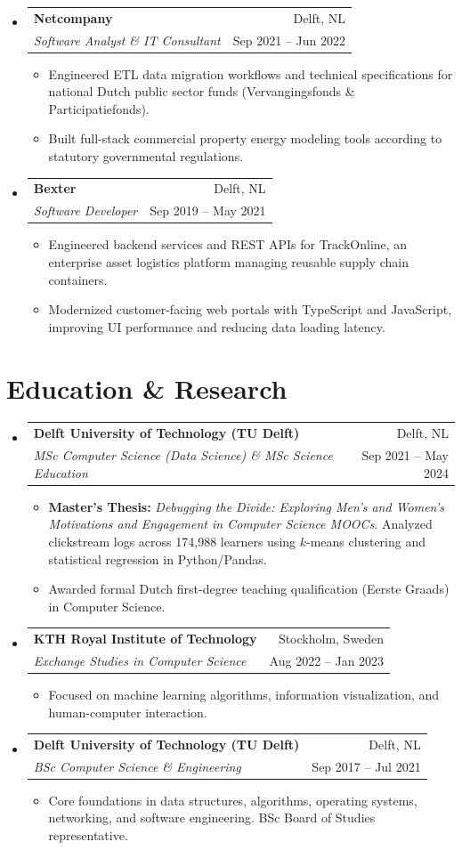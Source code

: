 \documentclass[10pt,a4paper]{article}
\makeatletter
\newcommand{\resumeSubheading}[4]{
  \vspace{1pt}
  \item[]
  \begin{tabular*}{\linewidth}{@{}l@{\extracolsep{\fill}}r@{}}
    \textbf{#1} & \footnotesize \color{subtle} #2 \\
    \textit{\small #3} & \footnotesize \color{subtle} #4 \\
  \end{tabular*}\vspace{-2pt}
}
\newcommand{\resumeItemListStart}{\begin{itemize}[leftmargin=1.1em, label=\textcolor{accent}{\scriptsize$\bullet$}, itemsep=1.5pt, topsep=1.5pt]}
\newcommand{\resumeItemListEnd}{\end{itemize}\vspace{-2pt}}
\makeatother
\begin{document}
\begin{itemize}[leftmargin=0em, label={}]
  \resumeSubheading
    {Netcompany}{Delft, NL}
    {Software Analyst \& IT Consultant}{Sep 2021 -- Jun 2022}
    \resumeItemListStart
      \item Engineered ETL data migration workflows and technical specifications for national Dutch public sector funds (Vervangingsfonds \& Participatiefonds).
      \item Built full-stack commercial property energy modeling tools according to statutory governmental regulations.
    \resumeItemListEnd

  \resumeSubheading
    {Bexter}{Delft, NL}
    {Software Developer}{Sep 2019 -- May 2021}
    \resumeItemListStart
      \item Engineered backend services and REST APIs for TrackOnline, an enterprise asset logistics platform managing reusable supply chain containers.
      \item Modernized customer-facing web portals with TypeScript and JavaScript, improving UI performance and reducing data loading latency.
    \resumeItemListEnd

\end{itemize}

\section{Education \& Research}
\begin{itemize}[leftmargin=0em, label={}]

  \resumeSubheading
    {Delft University of Technology (TU Delft)}{Delft, NL}
    {MSc Computer Science (Data Science) \& MSc Science Education}{Sep 2021 -- May 2024}
    \resumeItemListStart
      \item \textbf{Master's Thesis:} \textit{Debugging the Divide: Exploring Men's and Women's Motivations and Engagement in Computer Science MOOCs}. Analyzed clickstream logs across 174,988 learners using $k$-means clustering and statistical regression in Python/Pandas.
      \item Awarded formal Dutch first-degree teaching qualification (Eerste Graads) in Computer Science.
    \resumeItemListEnd

  \resumeSubheading
    {KTH Royal Institute of Technology}{Stockholm, Sweden}
    {Exchange Studies in Computer Science}{Aug 2022 -- Jan 2023}
    \resumeItemListStart
      \item Focused on machine learning algorithms, information visualization, and human-computer interaction.
    \resumeItemListEnd

  \resumeSubheading
    {Delft University of Technology (TU Delft)}{Delft, NL}
    {BSc Computer Science \& Engineering}{Sep 2017 -- Jul 2021}
    \resumeItemListStart
      \item Core foundations in data structures, algorithms, operating systems, networking, and software engineering. BSc Board of Studies representative.
    \resumeItemListEnd

\end{itemize}
\end{document}
